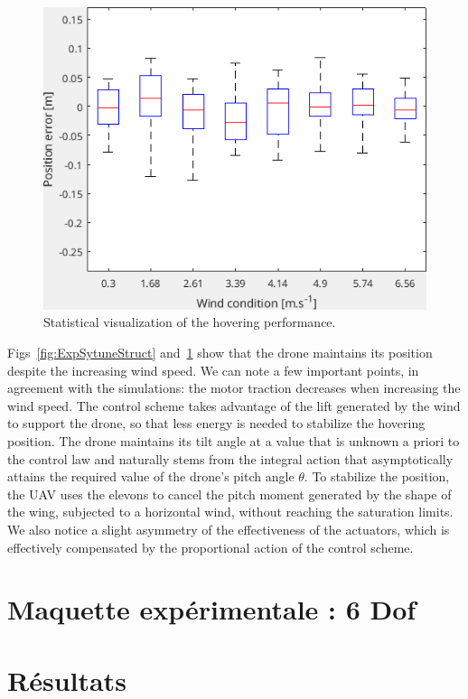 \begin{figure}[ht!]
    \centering
    \includegraphics[trim=0cm 0cm 0cm 0cm,clip,width=0.9\columnwidth]{figures/boxplot.png}
    \caption{Statistical visualization of the hovering performance.}
    \label{fig:statpos}
\end{figure}
Figs~\ref{fig:ExpSytuneStruct} and~\ref{fig:statpos} show that the drone maintains its position despite the increasing wind speed. We can note a few important points, in agreement with the simulations: the motor traction decreases when increasing the wind speed. The control scheme takes advantage of the lift generated by the wind to support the drone, so that less energy is needed to stabilize the hovering position. The drone maintains its tilt angle at a value that is unknown a priori to the control law and naturally stems from the integral action that asymptotically attains the required value of the drone's pitch angle $\theta$. To stabilize the position, the UAV uses the elevons to cancel the pitch moment generated by the shape of the wing, subjected to a horizontal wind, without reaching the saturation limits.
We also notice a slight asymmetry of the effectiveness of the actuators, which is effectively compensated by the proportional action of the control scheme.
\section{Maquette expérimentale : 6 Dof}

\section{Résultats}






